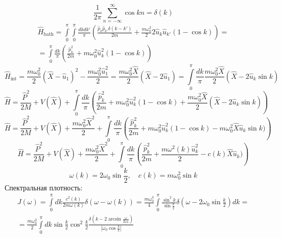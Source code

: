 \documentclass[12pt]{article}
\theoremstyle{definition}
\begin{document}
\begin{equation}
    \frac{1}{2\pi}\sum\limits_{n=-\infty}^\infty\cos kn=\delta(k)
\end{equation}
\begin{multline}
    \hat{H}_\text{bath}=\int\limits_0^\pi\int\limits_0^\pi\frac{dkdk'}{\pi}\left(\frac{\hat{p}_k\hat{p}_{k'}\delta(k-k')}{2m}+\frac{m\omega^2_0}{2}2\hat{u}_k\hat{u}_{k'}(1-\cos k)\right)=\\=\int\limits_0^\pi\frac{dk}{\pi}\left(\frac{\hat{p}^2_k}{2m}+m\omega^2_0\hat{u}^2_k(1-\cos k)\right)
\end{multline}
\begin{equation}
    \hat{H}_\text{int}=\frac{m\omega^2_0}{2}(\hat{X}-\hat{u}_1)^2-\frac{m\omega^2_0\hat{u}^2_1}{2}=\frac{m\omega^2_0\hat{X}}{2}(\hat{X}-2\hat{u}_1)=\int\limits_0^\pi\frac{dk}{\pi}\frac{m\omega^2_0\hat{X}}{2}(\hat{X}-2\hat{u}_k\sin k)
\end{equation}
\begin{equation}
    \hat{H}=\frac{\hat{P}^2}{2M}+V(\hat{X})+\int\limits_0^\pi\frac{dk}{\pi}\left(\frac{\hat{p}^2_k}{2m}+m\omega^2_0\hat{u}^2_k(1-\cos k)+\frac{m\omega^2_0\hat{X}}{2}(\hat{X}-2\hat{u}_k\sin k)\right)
\end{equation}
\begin{equation}
    \hat{H}=\frac{\hat{P}^2}{2M}+V(\hat{X})+\frac{m\omega^2_0\hat{X}^2}{2}+\int\limits_0^\pi\frac{dk}{\pi}\left(\frac{\hat{p}^2_k}{2m}+m\omega^2_0\hat{u}^2_k(1-\cos k)-m\omega^2_0\hat{X}\hat{u}_k\sin k)\right)
\end{equation}
\begin{equation}
    \hat{H}=\frac{\hat{P}^2}{2M}+V(\hat{X})+\frac{m\omega^2_0\hat{X}^2}{2}+\int\limits_0^\pi\frac{dk}{\pi}\left(\frac{\hat{p}^2_k}{2m}+\frac{m\omega^2(k)\hat{u}^2_k}{2}-c(k)\hat{X}\hat{u}_k)\right)
\end{equation}
\begin{equation}
    \omega(k)=2\omega_0\sin\frac{k}{2},\quad c(k)=m\omega_0^2\sin k
\end{equation}
Спектральная плотность:
\begin{multline}
    J(\omega)=\int\limits_0^\pi dk\frac{c^2(k)}{2m\omega(k)}\delta(\omega-\omega(k))=\frac{m\omega^3_0}{4}\int\limits_0^\pi\frac{\sin^2k}{\sin\frac{k}{2}}\delta\left(\omega-2\omega_0\sin\frac{k}{2}\right)dk=\\=\frac{m\omega^3_0}{2}\int\limits_0^\pi dk\sin\frac{k}{2}\cos^2\frac{k}{2}\frac{\delta(k-2\arcsin\frac{\omega}{2\omega_0})}{|\omega_0\cos\frac{k}{2}|}
\end{multline}
\end{document}
